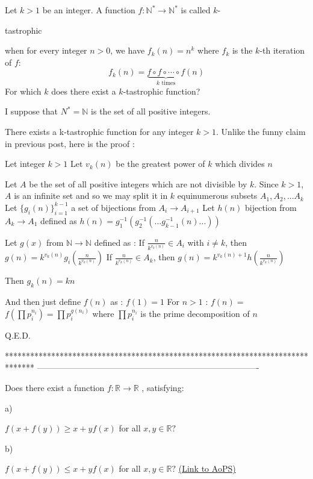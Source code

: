 \begin{solution}
	\begin{tcolorbox}Let $k>1$ be an integer. A function $f:\mathbb{N^*}\to\mathbb{N^*}$ is called $k$-\begin{italicized}tastrophic\end{italicized} when for every integer $n>0$, we have $f_k(n)=n^k$ where $f_k$ is the $k$-th iteration of $f$:
\[f_k(n)=\underbrace{f\circ f\circ\cdots \circ f}_{k\text{ times}}(n)\]
For which $k$ does there exist a $k$-tastrophic function?\end{tcolorbox}
I suppose that $N^*=\mathbb N$ is the set of all positive integers.

There exists a k-tastrophic function for any integer $k>1$.
Unlike the funny claim in previous post, here is the proof :

Let integer $k>1$
Let $v_k(n)$ be the greatest power of $k$ which divides $n$

Let $A$ be the set of all positive integers which are not divisible by $k$.
Since $k>1$, $A$ is an infinite set and so we may split it in $k$ equinumerous subsets $A_1,A_2,...A_k$
Let $\{g_i(n)\}_{i=1}^{k-1}$ a set of bijections from $A_i\to A_{i+1}$
Let $h(n)$ bijection from $A_k\to A_1$ defined as $h(n)=g_{1}^{-1}(g_{2}^{-1}(...g_{k-1}^{-1}(n)...))$

Let $g(x)$ from $\mathbb N\to\mathbb N$ defined as :
If $\frac n{k^{v_k(n)}}\in A_i$ with $i\ne k$, then $g(n)=k^{v_k(n)}g_i\left (\frac n{k^{v_k(n)}}\right )$
If $\frac n{k^{v_k(n)}}\in A_k$, then $g(n)=k^{v_k(n)+1}h\left (\frac n{k^{v_k(n)}}\right )$

Then $g_k(n)=kn$

And then just define $f(n)$ as :
$f(1)=1$
For $n>1$ : $f(n)=$ $f\left(\prod p_i^{n_i}\right)=\prod p_i^{g(n_i)}$ where $\prod p_i^{n_i}$ is the prime decomposition of $n$

Q.E.D.
\end{solution}
*******************************************************************************
-------------------------------------------------------------------------------

\begin{problem}
	Does there exist a function $ f :\mathbb{R}\to\mathbb{R} $ , satisfying:
\begin{italicized}a)\end{italicized} $ f(x+f(y))\geq x+yf(x) $ for all $ x,y\in\mathbb{R}? $
\begin{italicized}b)\end{italicized} $ f(x+f(y))\leq x+yf(x) $ for all $ x,y\in\mathbb{R}? $
	\flushright \href{https://artofproblemsolving.com/community/c6h494261}{(Link to AoPS)}
\end{problem}



